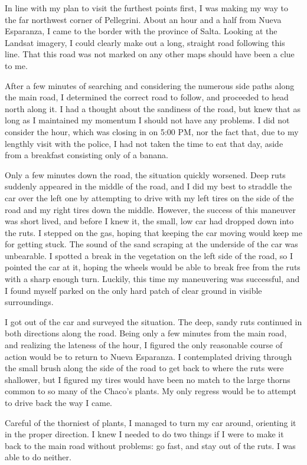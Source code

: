 In line with my plan to visit the furthest points first, I was making my way to the far northwest corner of Pellegrini. About an hour and a half from Nueva Esparanza, I came to the border with the province of Salta. Looking at the Landsat imagery, I could clearly make out a long, straight road following this line. That this road was not marked on any other maps should have been a clue to me.

After a few minutes of searching and considering the numerous side paths along the main road, I determined the correct road to follow, and proceeded to head north along it. I had a thought about the sandiness of the road, but knew that as long as I maintained my momentum I should not have any problems. I did not consider the hour, which was closing in on 5:00 PM, nor the fact that, due to my lengthly visit with the police, I had not taken the time to eat that day, aside from a breakfast consisting only of a banana.

Only a few minutes down the road, the situation quickly worsened. Deep ruts suddenly appeared in the middle of the road, and I did my best to straddle the car over the left one by attempting to drive with my left tires on the side of the road and my right tires down the middle. However, the success of this maneuver was short lived, and before I knew it, the small, low car had dropped down into the ruts. I stepped on the gas, hoping that keeping the car moving would keep me for getting stuck. The sound of the sand scraping at the underside of the car was unbearable. I spotted a break in the vegetation on the left side of the road, so I pointed the car at it, hoping the wheels would be able to break free from the ruts with a sharp enough turn. Luckily, this time my maneuvering was successful, and I found myself parked on the only hard patch of clear ground in visible surroundings.

I got out of the car and surveyed the situation. The deep, sandy ruts continued in both directions along the road. Being only a few minutes from the main road, and realizing the lateness of the hour, I figured the only reasonable course of action would be to return to Nueva Esparanza. I contemplated driving through the small brush along the side of the road to get back to where the ruts were shallower, but I figured my tires would have been no match to the large thorns common to so many of the Chaco’s plants. My only regress would be to attempt to drive back the way I came.

Careful of the thorniest of plants, I managed to turn my car around, orienting it in the proper direction. I knew I needed to do two things if I were to make it back to the main road without problems: go fast, and stay out of the ruts. I was able to do neither.

